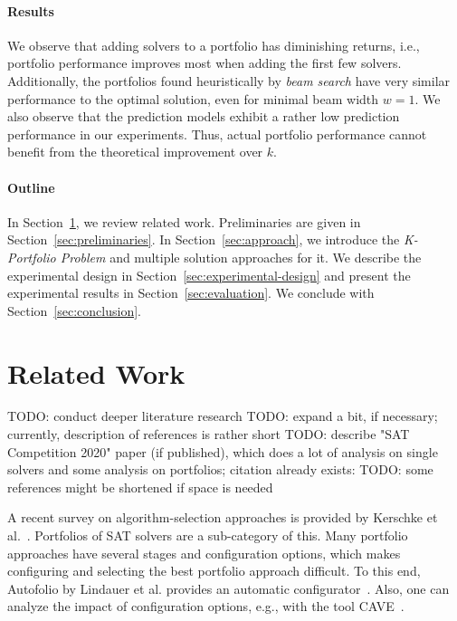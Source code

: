 \documentclass[conference]{IEEEtran}
\newcommand{\todo}[1]{{\color{red}TODO: #1}}
\begin{document}
\paragraph{Results}

We observe that adding solvers to a portfolio has diminishing returns, i.e., portfolio performance improves most when adding the first few solvers. %
Additionally, the portfolios found heuristically by \emph{beam search} have very similar performance to the optimal solution, even for minimal beam width $w=1$. %
We also observe that the prediction models exhibit a rather low prediction performance in our experiments. %
Thus, actual portfolio performance cannot benefit from the theoretical improvement over $k$. 

\paragraph{Outline}

In Section~\ref{sec:related-work}, we review related work. 
Preliminaries are given in Section~\ref{sec:preliminaries}. 
In Section~\ref{sec:approach}, we introduce the \emph{K-Portfolio Problem} and multiple solution approaches for it. 
We describe the experimental design in Section~\ref{sec:experimental-design} and present the experimental results in Section~\ref{sec:evaluation}. 
We conclude with Section~\ref{sec:conclusion}. 

\section{Related Work}
\label{sec:related-work}

\todo{conduct deeper literature research}
\todo{expand a bit, if necessary; currently, description of references is rather short}
\todo{describe "SAT Competition 2020" paper (if published), which does a lot of analysis on single solvers and some analysis on portfolios; citation already exists: \cite{SC2020:AIJ}}
\todo{some references might be shortened if space is needed}

A recent survey on algorithm-selection approaches is provided by Kerschke et al.~\cite{kerschke2019automated}.
Portfolios of SAT solvers are a sub-category of this. 
Many portfolio approaches have several stages and configuration options, which makes configuring and selecting the best portfolio approach difficult.
To this end, Autofolio by Lindauer et al. provides an automatic configurator~\cite{lindauer2015autofolio}.
Also, one can analyze the impact of configuration options, e.g., with the tool CAVE~\cite{biedenkapp2018cave}. 
\end{document}
